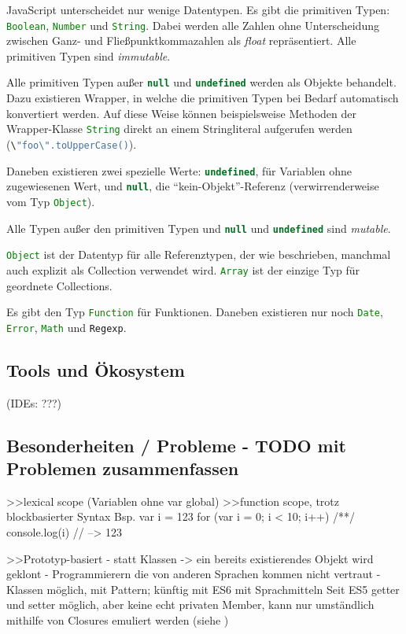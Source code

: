 \documentclass[a4paper, 12pt, hidelinks, listof=totoc, listoftables=totoc, bibliography=totoc]{scrreprt}
\newcommand{\js}[1]{\lstinline[language=JavaScript, style=inline]|#1|}
\begin{document}
JavaScript unterscheidet nur wenige Datentypen. Es gibt die primitiven Typen: \js{Boolean}, \js{Number} und \js{String}. 
Dabei werden alle Zahlen ohne Unterscheidung zwischen Ganz- und Fließpunktkommazahlen als \textit{float} repräsentiert. Alle primitiven Typen sind \textit{immutable}.

Alle primitiven Typen außer \js{null} und \js{undefined} werden als Objekte behandelt. Dazu existieren Wrapper, in welche die primitiven Typen bei Bedarf automatisch konvertiert werden. Auf diese Weise können beispielsweise Methoden der Wrapper-Klasse \js{String} direkt an einem Stringliteral aufgerufen werden (\js{\"foo\".toUpperCase()}).

Daneben existieren zwei spezielle Werte: \js{undefined}, für Variablen ohne zugewiesenen Wert, und \js{null}, die "`kein-Objekt"'-Referenz (verwirrenderweise vom Typ \js{Object}).

Alle Typen außer den primitiven Typen und \js{null} und \js{undefined} sind \textit{mutable}.

\js{Object} ist der Datentyp für alle Referenztypen, der wie beschrieben, manchmal auch explizit als Collection verwendet wird. \js{Array} ist der einzige Typ für geordnete Collections.

Es gibt den Typ \js{Function} für Funktionen. Daneben existieren nur noch \js{Date}, \js{Error}, \js{Math} und \js{Regexp}.
\cite[S. 29 ff.]{flanagan2011.JDG}

\subsection{Tools und Ökosystem}



(IDEs: ???)


\subsection{Besonderheiten / Probleme - TODO mit Problemen zusammenfassen}

>>lexical scope (Variablen ohne var global)
>>function scope, trotz blockbasierter Syntax
Bsp.
var i = 123
for (var i = 0; i < 10; i++) { /**/ }
console.log(i) // --> 123

>>Prototyp-basiert
- statt Klassen
-> ein bereits existierendes Objekt wird geklont
- Programmierern die von anderen Sprachen kommen nicht vertraut
- Klassen möglich, mit Pattern; künftig mit ES6 mit Sprachmitteln
Seit ES5 getter und setter möglich, aber keine echt privaten Member, kann nur umständlich mithilfe von Closures emuliert werden
(siehe \cite[S. 226]{flanagan2011.JDG})
\end{document}
